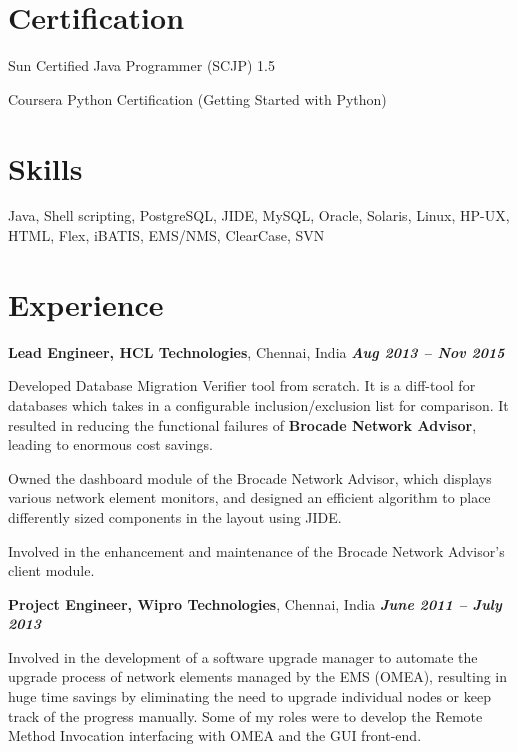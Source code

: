 \documentclass[margin]{resume}
\begin{document}
\begin{resume}
			\vspace{-6mm}
    \section{\mysidestyle Certification}
\begin{list2}
\item Sun Certified Java Programmer (SCJP) 1.5
\item Coursera Python Certification (Getting Started with Python)
\end{list2}

			\vspace{-1mm}
    \section{\mysidestyle Skills}
		Java, Shell scripting, PostgreSQL, JIDE, MySQL, Oracle, Solaris, Linux, HP-UX, HTML, Flex, iBATIS, EMS/NMS, ClearCase, SVN

\vspace{-2mm}
\section{\mysidestyle Experience}
\textbf{Lead Engineer, HCL Technologies}, Chennai, India \hfill \textbf{\textit{Aug 2013 -- Nov 2015}}\\
\vspace{-10pt}
\begin{list2}
\item Developed Database Migration Verifier tool from scratch. It is a
diff-tool for databases which takes in a configurable inclusion/exclusion list
for comparison. It resulted in reducing the functional failures of
\textbf{Brocade Network Advisor}, leading to enormous cost savings.
\item Owned the dashboard module of the Brocade Network Advisor, which displays
various network element monitors, and designed an efficient algorithm to place
differently sized components in the layout using JIDE.
\item Involved in the enhancement and maintenance of the Brocade Network
Advisor's client module.
\end{list2}
	
\textbf{Project Engineer, Wipro Technologies}, Chennai, India \hfill \textbf{\textit{June 2011 -- July 2013}}\\
\vspace{-10pt}
\begin{list2}\item
Involved in the development of a software upgrade manager to automate the
upgrade process of network elements managed by the EMS (OMEA), resulting in
huge time savings by eliminating the need to upgrade individual nodes or keep
track of the progress manually. Some of my roles were to develop the Remote
Method Invocation interfacing with OMEA and the GUI front-end.
\end{list2}


\end{resume}
\end{document}
